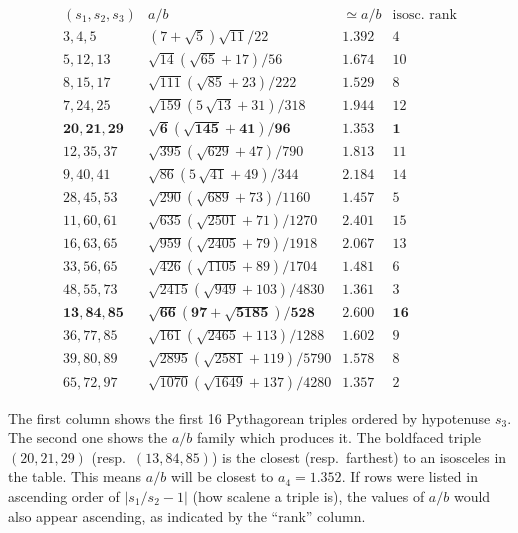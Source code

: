 \begin{table}[H]
\scriptsize
$$
\begin{array}{r|c|l|l}
(s_1,s_2,s_3) & a/b & {\simeq}a/b & \text{isosc. rank} \\
\hline
3, 4, 5 & {(7+\sqrt{5})\sqrt{11}}/{22} &  1.392 &  4 \\
5, 12, 13 & {\sqrt{14} (\sqrt{65}+17)}/{56} & 1.674 &  10 \\
8, 15, 17 & {\sqrt{111} (\sqrt{85}+23)}/{222} & 1.529 & 8\\
7, 24, 25  & {\sqrt{159} (5\,\sqrt{13}+31)}/{318} & 1.944 & 12 \\
\mathbf{20, 21, 29} & \mathbf{\sqrt{6} (\sqrt{145}+41)/{96}} & \mathbf{1.353} &  \mathbf{1} \\
12, 35, 37 & {\sqrt{395} (\sqrt{629}+47)}/{790} & 1.813 & 11 \\
9, 40, 41 & {\sqrt{86} (5\,\sqrt{41}+49)}/{344}& 2.184 &  14 \\
28, 45, 53 & {\sqrt{290} (\sqrt{689}+73)}/{1160} & 1.457 & 5 \\
11, 60, 61 & {\sqrt{635} (\sqrt{2501}+71)}/{1270} & 2.401 & 15 \\
16, 63, 65 & {\sqrt{959} (\sqrt{2405}+79)}/{1918} & 2.067 & 13 \\
33, 56, 65 & {\sqrt{426} (\sqrt{1105}+89)}/{1704} & 1.481  & 6 \\
48, 55, 73 & {\sqrt{2415} (\sqrt{949}+103)}/{4830} & 1.361 &  3 \\
\mathbf{13, 84, 85} & \mathbf{\sqrt{66} (97+\sqrt{5185})/{528}} & \mathbf{2.600} & \mathbf{16} \\
36, 77, 85 & {\sqrt{161} (\sqrt{2465}+113)}/{1288} & 1.602 & 9 \\
39, 80, 89 & {\sqrt{2895} (\sqrt{2581}+119)}/{5790} & 1.578 &  8 \\
65, 72, 97 & {\sqrt{1070} (\sqrt{1649}+137)}/{4280}& 1.357 & 2
\end{array}
$$
\caption{The first column shows the first 16 Pythagorean triples ordered by hypotenuse $s_3$. The second one shows the $a/b$ family which produces it. The boldfaced triple $(20,21,29)$ (resp.~$(13,84,85)$) is the closest (resp.~farthest) to an isosceles in the table. This means $a/b$ will be closest to $a_4=1.352$. If rows were listed in ascending order of  $|s_1/s_2-1|$ (how scalene a triple is), the values of $a/b$ would also appear ascending, as indicated by the ``rank'' column.}
\label{tab:pythagorean}
\end{table}
%


